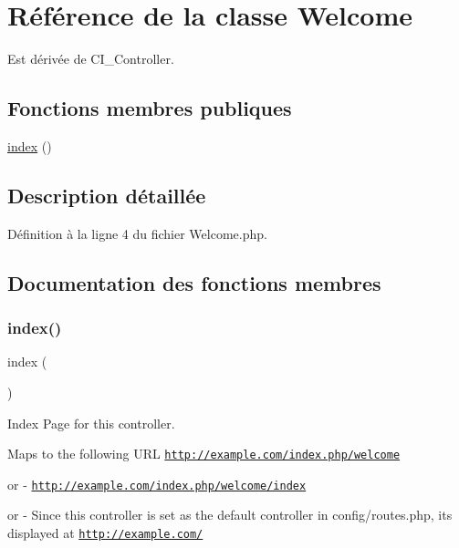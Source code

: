 \hypertarget{class_welcome}{}\section{Référence de la classe Welcome}
\label{class_welcome}


Est dérivée de C\+I\+\_\+\+Controller.

\subsection*{Fonctions membres publiques}
\begin{DoxyCompactItemize}
\item 
\mbox{\hyperlink{class_welcome_a149eb92716c1084a935e04a8d95f7347}{index}} ()
\end{DoxyCompactItemize}


\subsection{Description détaillée}


Définition à la ligne 4 du fichier Welcome.\+php.



\subsection{Documentation des fonctions membres}
\mbox{\label{class_welcome_a149eb92716c1084a935e04a8d95f7347}} 
\subsubsection{\texorpdfstring{index()}{index()}}
{\footnotesize\ttfamily index (\begin{DoxyParamCaption}{ }\end{DoxyParamCaption})}

Index Page for this controller.

Maps to the following U\+RL \href{http://example.com/index.php/welcome}{\tt http\+://example.\+com/index.\+php/welcome}
\begin{DoxyItemize}
\item or -\/ \href{http://example.com/index.php/welcome/index}{\tt http\+://example.\+com/index.\+php/welcome/index}
\item or -\/ Since this controller is set as the default controller in config/routes.\+php, it\textquotesingle{}s displayed at \href{http://example.com/}{\tt http\+://example.\+com/}
\end{DoxyItemize}

